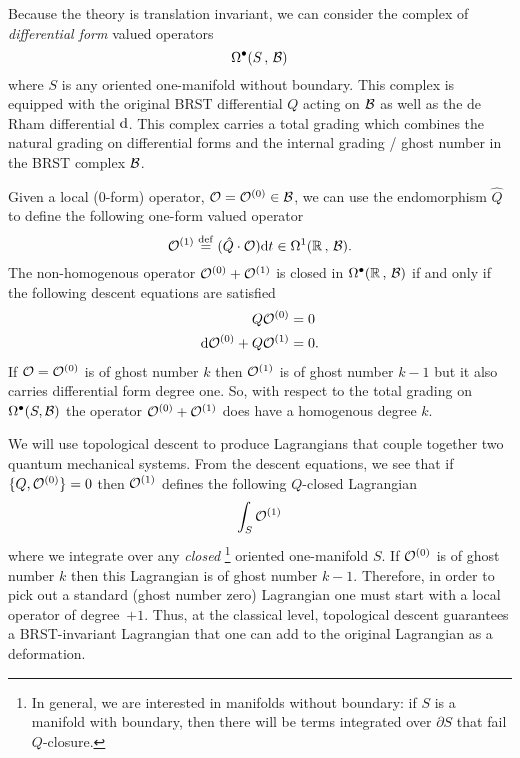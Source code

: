 \documentclass[11pt]{amsart}
\def\natalie#1{{\textcolor{green!65!black}{NMP: {#1}}}}
\begin{document}
Because the theory is translation invariant, we can consider the complex of {\em differential form} valued operators
\[
\Omega^\bullet(S \, , \, \mathcal B) 
\]
where $S$ is any oriented one-manifold without boundary. 
This complex is equipped with the original BRST differential $Q$ acting on $\mathcal B$ as well as the de Rham differential ${\rm d}$. 
This complex carries a total grading which combines the natural grading on differential forms and the internal grading / ghost number in the BRST complex $\mathcal B$.  

Given a local (0-form) operator, $\mathcal O = \mathcal O^{(0)} \in \mathcal B$, we can use the endomorphism $\hat{Q}$ to define the following one-form valued operator
\[
\mathcal O^{(1)} \overset{\rm def}{=} (\hat{Q} \cdot \mathcal O) {\rm d} t \in \Omega^1(\mathbb R \, , \, \mathcal B).
\]
The non-homogenous operator $\mathcal O^{(0)} + \mathcal O^{(1)}$ is closed in $\Omega^\bullet(\mathbb R \, , \, \mathcal B)$ if and only if the following descent equations are satisfied 
\begin{align*}
Q \mathcal O^{(0)} & = 0 \\
{\rm d} \mathcal O^{(0)} + Q \mathcal O^{(1)} & = 0 .
\end{align*}
If $\mathcal O = \mathcal O^{(0)}$ is of ghost number $k$ then $\mathcal O^{(1)}$ is of ghost number $k-1$ but it also carries differential form degree one. 
So, with respect to the total grading on $\Omega^\bullet(S, \mathcal B)$ the operator $\mathcal O^{(0)} + \mathcal O^{(1)}$ does have a homogenous degree $k$.

We will use topological descent to produce Lagrangians that couple together two quantum mechanical systems. 
From the descent equations, we see that if $\{Q,\mathcal O^{(0)}\} = 0$ then $\mathcal O^{(1)}$ defines the following $Q$-closed Lagrangian
\[
\int_S \mathcal O^{(1)} 
\]
where we integrate over any \textit{closed} \footnote{In general, we are interested in manifolds without boundary: if $S$ is a manifold with boundary, then there will be terms integrated over $\partial S$ that fail $Q$-closure.} oriented one-manifold $S$.
If $\mathcal O^{(0)}$ is of ghost number $k$ then this Lagrangian is of ghost number $k-1$. 
Therefore, in order to pick out a standard (ghost number zero) Lagrangian one must start with a local operator of degree~$+1$. %
Thus, at the classical level, topological descent guarantees a BRST-invariant Lagrangian that one can add to the original Lagrangian as a deformation. 
\end{document}
